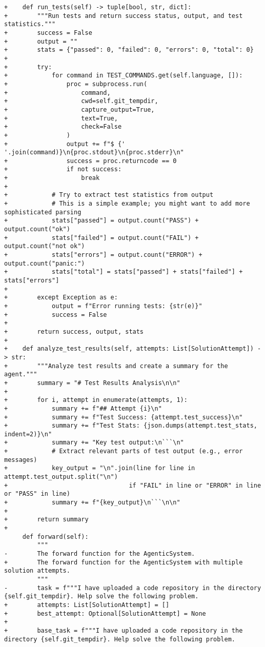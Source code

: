 \begin{lstlisting}[style=diffstyle]
+    def run_tests(self) -> tuple[bool, str, dict]:
+        """Run tests and return success status, output, and test statistics."""
+        success = False
+        output = ""
+        stats = {"passed": 0, "failed": 0, "errors": 0, "total": 0}
+
+        try:
+            for command in TEST_COMMANDS.get(self.language, []):
+                proc = subprocess.run(
+                    command, 
+                    cwd=self.git_tempdir,
+                    capture_output=True,
+                    text=True,
+                    check=False
+                )
+                output += f"$ {' '.join(command)}\n{proc.stdout}\n{proc.stderr}\n"
+                success = proc.returncode == 0
+                if not success:
+                    break
+
+            # Try to extract test statistics from output
+            # This is a simple example; you might want to add more sophisticated parsing
+            stats["passed"] = output.count("PASS") + output.count("ok")
+            stats["failed"] = output.count("FAIL") + output.count("not ok")
+            stats["errors"] = output.count("ERROR") + output.count("panic:")
+            stats["total"] = stats["passed"] + stats["failed"] + stats["errors"]
+            
+        except Exception as e:
+            output = f"Error running tests: {str(e)}"
+            success = False
+
+        return success, output, stats
+
+    def analyze_test_results(self, attempts: List[SolutionAttempt]) -> str:
+        """Analyze test results and create a summary for the agent."""
+        summary = "# Test Results Analysis\n\n"
+        
+        for i, attempt in enumerate(attempts, 1):
+            summary += f"## Attempt {i}\n"
+            summary += f"Test Success: {attempt.test_success}\n"
+            summary += f"Test Stats: {json.dumps(attempt.test_stats, indent=2)}\n"
+            summary += "Key test output:\n```\n"
+            # Extract relevant parts of test output (e.g., error messages)
+            key_output = "\n".join(line for line in attempt.test_output.split("\n") 
+                                 if "FAIL" in line or "ERROR" in line or "PASS" in line)
+            summary += f"{key_output}\n```\n\n"
+
+        return summary
+
     def forward(self):
         """
-        The forward function for the AgenticSystem.
+        The forward function for the AgenticSystem with multiple solution attempts.
         """
-        task = f"""I have uploaded a code repository in the directory {self.git_tempdir}. Help solve the following problem.
+        attempts: List[SolutionAttempt] = []
+        best_attempt: Optional[SolutionAttempt] = None
+
+        base_task = f"""I have uploaded a code repository in the directory {self.git_tempdir}. Help solve the following problem.
 

\end{lstlisting}
